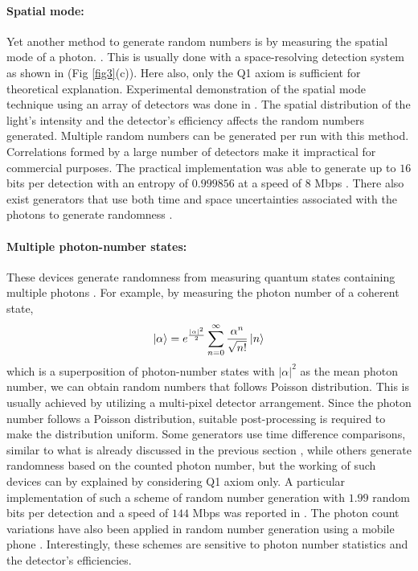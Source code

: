 \documentclass[]{interact}
\theoremstyle{plain}%
\theoremstyle{definition}
\theoremstyle{remark}
\begin{document}
\paragraph{Spatial mode:} Yet another method to generate random numbers is by measuring the spatial mode of a photon. \cite{Yan2014,burri2014spads}. This is usually done with a space-resolving detection system as shown in  (Fig \ref{fig3}(c)). Here also, only the Q1 axiom is sufficient for theoretical explanation. Experimental demonstration of the spatial mode technique using an array of detectors was done in \cite{doi:10.1063/1.4897485}. The spatial distribution of the light's intensity and the detector's efficiency affects the random numbers generated. Multiple random numbers can be generated per run with this method. Correlations formed by a large number of detectors make it impractical for commercial purposes. The practical implementation was able to generate up to $16$ bits per detection with an entropy of $0.999856$ at a speed of $8$ Mbps \cite{Yan2014}.
There also exist generators that use both time and
space uncertainties associated with the photons to generate randomness \cite{li2013true,thamrin2008photonic}.



\paragraph{Multiple photon-number states:} These devices generate randomness from measuring quantum states containing multiple
photons \cite{furst2010high,jian2011two,soares2014quantum,tisa2014high}. For example, by measuring the photon number of a coherent state,
$$\ket{\alpha}=e^{\frac{|\alpha|^2}{2}}\sum_{n=0}^\infty\frac{\alpha^n}{\sqrt{n!}}\ket{n}$$
which is  a superposition of photon-number states with $|\alpha|^2$ as the mean photon number, we can obtain random numbers that follows Poisson
distribution.
This is usually achieved by utilizing a multi-pixel detector arrangement. Since the photon number follows a Poisson
distribution, suitable post-processing is required to make the distribution uniform. Some generators use time
difference comparisons, similar to what is already discussed in the previous section \cite{ren2011quantum}, while
others generate randomness based 
 on the counted photon number, but the working of such devices can by explained by considering Q1 axiom only. A particular implementation of such a scheme of random number generation with $1.99$ random bits per detection and a speed of $144$ Mbps was reported in \cite{applegate2015efficient}.
The photon count variations have also been applied in random number generation using a mobile phone \cite{sanguinetti2014quantum}. Interestingly, these schemes are sensitive to photon number statistics and the detector's efficiencies.
\end{document}
